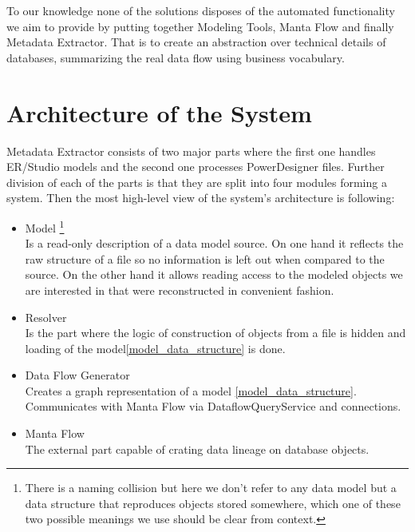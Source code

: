 To our knowledge none of the solutions disposes of the automated functionality we aim to provide by putting together Modeling Tools, Manta Flow and finally Metadata Extractor. That is to create an abstraction over technical details of databases, summarizing the real data flow using business vocabulary.

\section{Architecture of the System}

Metadata Extractor consists of two major parts where the first one handles ER/Studio models and the second one processes PowerDesigner files.
Further division of each of the parts is that they are split into four modules forming a system. 
Then the most high-level view of the system's architecture is following:
\begin{itemize}
	\item Model \label{model_data_structure}\footnote{There is a naming collision but here we don't refer to any data model but a data structure that reproduces objects stored somewhere, which one of these two possible meanings we use should be clear from context.}\\ 
	Is a read-only description of a data model source. On one hand it reflects the raw structure of a file so no information is left out when compared to the source. 
	On the other hand it allows reading access to the modeled objects we are interested in that were reconstructed in convenient fashion. 
	\item Resolver \\ 
	Is the part where the logic of construction of objects from a file is hidden and loading of the model\ref{model_data_structure} is done. 
	\item Data Flow Generator \\ 
	Creates a graph representation of a model \ref{model_data_structure}. Communicates with Manta Flow via DataflowQueryService and connections.
	\item Manta Flow \\
	The external part capable of crating data lineage on database objects.
\end{itemize}
